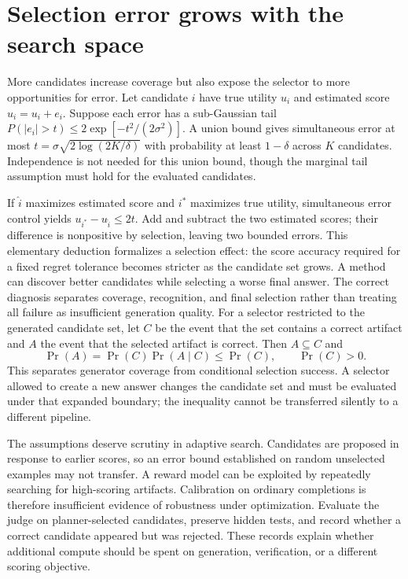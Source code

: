 \section{Selection error grows with the search space}
\label{sec:C09:selection}
More candidates increase coverage but also expose the selector to more opportunities for error. Let candidate $i$ have true utility $u_i$ and estimated score $\widehat u_i=u_i+e_i$. Suppose each error has a sub-Gaussian tail $P(|e_i|>t)\leq2\exp[-t^2/(2\sigma^2)]$. A union bound gives simultaneous error at most $t=\sigma\sqrt{2\log(2K/\delta)}$ with probability at least $1-\delta$ across $K$ candidates. Independence is not needed for this union bound, though the marginal tail assumption must hold for the evaluated candidates.

If $\widehat i$ maximizes estimated score and $i^*$ maximizes true utility, simultaneous error control yields $u_{i^*}-u_{\widehat i}\leq2t$. Add and subtract the two estimated scores; their difference is nonpositive by selection, leaving two bounded errors. This elementary deduction formalizes a selection effect: the score accuracy required for a fixed regret tolerance becomes stricter as the candidate set grows. A method can discover better candidates while selecting a worse final answer. The correct diagnosis separates coverage, recognition, and final selection rather than treating all failure as insufficient generation quality. For a selector restricted to the generated candidate set, let $C$ be the event that the set contains a correct artifact and $A$ the event that the selected artifact is correct. Then $A\subseteq C$ and
\begin{equation}
 \Pr(A)=\Pr(C)\Pr(A\mid C)\leq\Pr(C),
 \qquad\Pr(C)>0.
\end{equation}
This separates generator coverage from conditional selection success. A selector allowed to create a new answer changes the candidate set and must be evaluated under that expanded boundary; the inequality cannot be transferred silently to a different pipeline.

The assumptions deserve scrutiny in adaptive search. Candidates are proposed in response to earlier scores, so an error bound established on random unselected examples may not transfer. A reward model can be exploited by repeatedly searching for high-scoring artifacts. Calibration on ordinary completions is therefore insufficient evidence of robustness under optimization. Evaluate the judge on planner-selected candidates, preserve hidden tests, and record whether a correct candidate appeared but was rejected. These records explain whether additional compute should be spent on generation, verification, or a different scoring objective.

